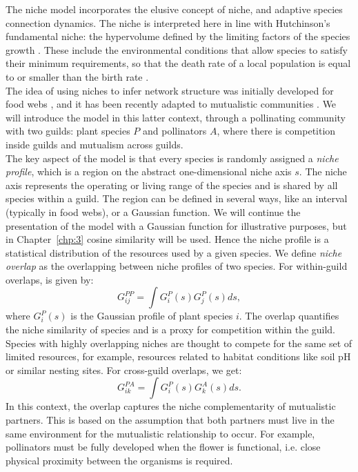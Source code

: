 The niche model incorporates the elusive concept of niche, and adaptive species connection dynamics. The niche is interpreted here in line with Hutchinson's fundamental niche: the hypervolume defined by the limiting factors of the species growth \cite{hutchinson1957concluding}. These include the environmental conditions that allow species to satisfy their minimum requirements, so that the death rate of a local population is equal to or smaller than the birth rate \cite{chase2009niches}. \\

The idea of using niches to infer network structure was initially developed for food webs \cite{williams2000niche}, and it has been recently adapted to mutualistic communities \cite{cai2021niches}. We will introduce the model in this latter context, through a pollinating community with two guilds: plant species $P$ and pollinators $A$, where there is competition inside guilds and mutualism across guilds. \\

The key aspect of the model is that every species is randomly assigned a \textit{niche profile}, which is a region on the abstract one-dimensional niche axis $s$. The niche axis represents the operating or living range of the species and is shared by all species within a guild. The region can be defined in several ways, like an interval (typically in food webs), or a Gaussian function. We will continue the presentation of the model with a Gaussian function for illustrative purposes, but in Chapter~\ref{chp:3} cosine similarity will be used.  Hence the niche profile is a statistical distribution of the resources used by a given species. We define \textit{niche overlap} as the overlapping between niche profiles of two species. For within-guild overlaps, is given by:
\begin{equation}
    G^{PP}_{i j}  =  \int G_i^P(s) G_j^P(s) ds,
\end{equation}
 where $ G_i^P(s)$ is the Gaussian profile of plant species $i$. The overlap quantifies the niche similarity of species and is a proxy for competition within the guild. Species with highly overlapping niches are thought to compete for the same set of limited resources, for example, resources related to habitat conditions like soil pH or similar nesting sites. For cross-guild overlaps, we get:
\begin{equation}
    G^{PA}_{ik}  =  \int G_i^P(s) G_k^A(s) ds.
\end{equation}
In this context, the overlap captures the niche complementarity of mutualistic partners. This is based on the assumption that both partners must live in the same environment for the mutualistic relationship to occur. For example, pollinators must be fully developed when the flower is functional, i.e. close physical proximity between the organisms is required.\\

